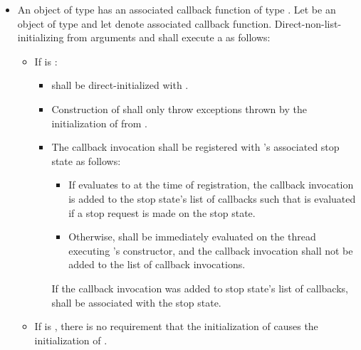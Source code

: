 \begin{itemize}
\item
An object of type  has
an associated callback function of type .
Let  be an object of type  and
let  denote  associated callback function.
Direct-non-list-initializing  from
arguments  and 
shall execute a  as follows:
\begin{itemize}
\item
If  is :
\begin{itemize}
\item
{} shall be direct-initialized with .
\item
Construction of  shall only throw exceptions
thrown by the initialization of  from .
\item
The callback invocation 
shall be registered with 's associated stop state as follows:
\begin{itemize}
\item
If  evaluates to 
at the time of registration,
the callback invocation is added to the stop state's list of callbacks
such that  is evaluated
if a stop request is made on the stop state.
\item
Otherwise, 
shall be immediately evaluated
on the thread executing 's constructor, and
the callback invocation shall not be added to the list of callback invocations.
\end{itemize}
If the callback invocation was added to stop state's list of callbacks,
 shall be associated with the stop state.
\end{itemize}
\item
\begin{note}
If  is ,
there is no requirement
that the initialization of 
causes the initialization of .
\end{note}
\end{itemize}


\end{itemize}
